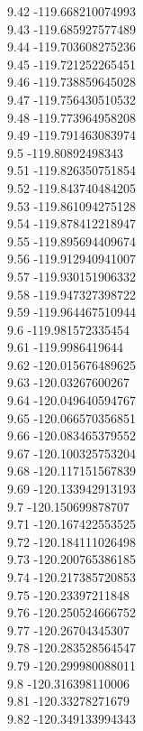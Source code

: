 {9.42	-119.668210074993\\
9.43	-119.685927577489\\
9.44	-119.703608275236\\
9.45	-119.721252265451\\
9.46	-119.738859645028\\
9.47	-119.756430510532\\
9.48	-119.773964958208\\
9.49	-119.791463083974\\
9.5	-119.80892498343\\
9.51	-119.826350751854\\
9.52	-119.843740484205\\
9.53	-119.861094275128\\
9.54	-119.878412218947\\
9.55	-119.895694409674\\
9.56	-119.912940941007\\
9.57	-119.930151906332\\
9.58	-119.947327398722\\
9.59	-119.964467510944\\
9.6	-119.981572335454\\
9.61	-119.9986419644\\
9.62	-120.015676489625\\
9.63	-120.03267600267\\
9.64	-120.049640594767\\
9.65	-120.066570356851\\
9.66	-120.083465379552\\
9.67	-120.100325753204\\
9.68	-120.117151567839\\
9.69	-120.133942913193\\
9.7	-120.150699878707\\
9.71	-120.167422553525\\
9.72	-120.184111026498\\
9.73	-120.200765386185\\
9.74	-120.217385720853\\
9.75	-120.23397211848\\
9.76	-120.250524666752\\
9.77	-120.26704345307\\
9.78	-120.283528564547\\
9.79	-120.299980088011\\
9.8	-120.316398110006\\
9.81	-120.33278271679\\
9.82	-120.349133994343\\
}
